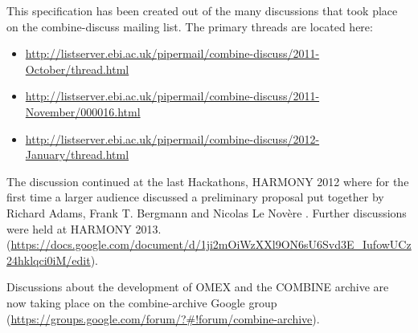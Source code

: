 This specification has been created out of the many discussions that took place
on the combine-discuss mailing list. The primary threads are located here: 

\begin{itemize}
	\item \href{http://listserver.ebi.ac.uk/pipermail/combine-discuss/2011-October/thread.html}{http://listserver.ebi.ac.uk/pipermail/combine-discuss/2011-October/thread.html}
	\item \href{http://listserver.ebi.ac.uk/pipermail/combine-discuss/2011-November/000016.html}{http://listserver.ebi.ac.uk/pipermail/combine-discuss/2011-November/000016.html}
	\item \href{http://listserver.ebi.ac.uk/pipermail/combine-discuss/2012-January/thread.html}{http://listserver.ebi.ac.uk/pipermail/combine-discuss/2012-January/thread.html}
\end{itemize}

The discussion continued at the last Hackathons, HARMONY 2012 where for the first time a larger audience discussed a preliminary proposal put together by Richard Adams, Frank T. Bergmann and Nicolas Le Nov\`{e}re \citep{Adams:2012}.  
Further discussions were held at HARMONY 2013.\\ (\url{https://docs.google.com/document/d/1ji2mOiWzXXl9ON6sU6Svd3E_IufowUCz24hklqci0iM/edit}). 

Discussions about the development of OMEX and the COMBINE archive are now taking place on the combine-archive Google group (\url{https://groups.google.com/forum/?#!forum/combine-archive}).
